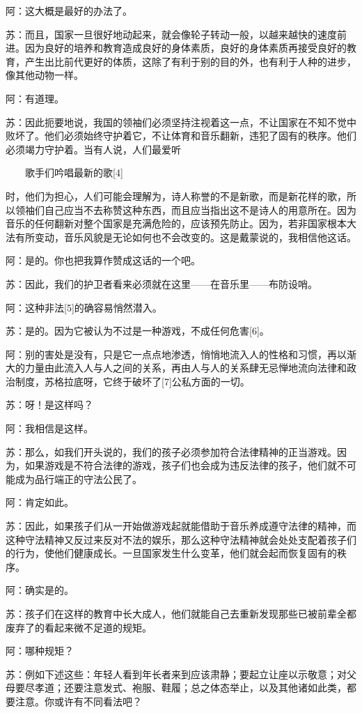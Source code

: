 \documentclass[12pt,oneside]{book}
\begin{document}
阿：这大概是最好的办法了。

苏：而且，国家一旦很好地动起来，就会像轮子转动一般，以越来越快的速度前进。因为良好的培养和教育造成良好的身体素质，良好的身体素质再接受良好的教育，产生出比前代更好的体质，这除了有利于别的目的外，也有利于人种的进步，像其他动物一样。

阿：有道理。

苏：因此扼要地说，我国的领袖们必须坚持注视着这一点，不让国家在不知不觉中败坏了。他们必须始终守护着它，不让体育和音乐翻新，违犯了固有的秩序。他们必须竭力守护着。当有人说，人们最爱听

　　歌手们吟唱最新的歌[4]

时，他们为担心，人们可能会理解为，诗人称誉的不是新歌，而是新花样的歌，所以领袖们自己应当不去称赞这种东西，而且应当指出这不是诗人的用意所在。因为音乐的任何翻新对整个国家是充满危险的，应该预先防止。因为，若非国家根本大法有所变动，音乐风貌是无论如何也不会改变的。这是戴蒙说的，我相信他这话。

阿：是的。你也把我算作赞成这话的一个吧。

苏：因此，我们的护卫者看来必须就在这里——在音乐里——布防设哨。

阿：这种非法[5]的确容易悄然潜入。

苏：是的。因为它被认为不过是一种游戏，不成任何危害[6]。

阿：别的害处是没有，只是它一点点地渗透，悄悄地流入人的性格和习惯，再以渐大的力量由此流入人与人之间的关系，再由人与人的关系肆无忌惮地流向法律和政治制度，苏格拉底呀，它终于破坏了[7]公私方面的一切。

苏：呀！是这样吗？

阿：我相信是这样。

苏：那么，如我们开头说的，我们的孩子必须参加符合法律精神的正当游戏。因为，如果游戏是不符合法律的游戏，孩子们也会成为违反法律的孩子，他们就不可能成为品行端正的守法公民了。

阿：肯定如此。

苏：因此，如果孩子们从一开始做游戏起就能借助于音乐养成遵守法律的精神，而这种守法精神又反过来反对不法的娱乐，那么这种守法精神就会处处支配着孩子们的行为，使他们健康成长。一旦国家发生什么变革，他们就会起而恢复固有的秩序。

阿：确实是的。

苏：孩子们在这样的教育中长大成人，他们就能自己去重新发现那些已被前辈全都废弃了的看起来微不足道的规矩。

阿：哪种规矩？

苏：例如下述这些：年轻人看到年长者来到应该肃静；要起立让座以示敬意；对父母要尽孝道；还要注意发式、袍服、鞋履；总之体态举止，以及其他诸如此类，都要注意。你或许有不同看法吧？
\end{document}
